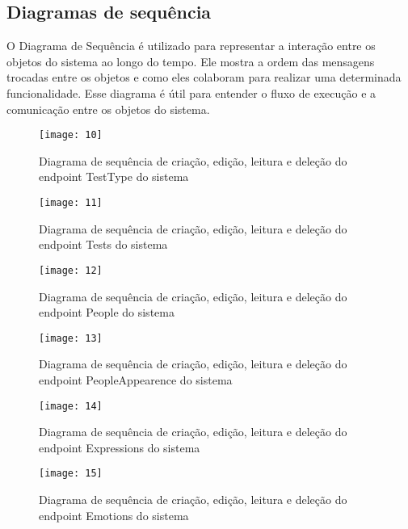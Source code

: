 \clearpage
\subsection{Diagramas de sequência \cite{28}}

O Diagrama de Sequência é utilizado para representar a interação entre os objetos do sistema ao longo do tempo. Ele mostra a ordem das mensagens trocadas entre os objetos e como eles colaboram para realizar uma determinada funcionalidade. Esse diagrama é útil para entender o fluxo de execução e a comunicação entre os objetos do sistema.

\begin{figure}[h]
  \caption{Diagrama de sequência de criação, edição, leitura e deleção do endpoint TestType do sistema}
  \centering
  \texttt{[image: 10]}
\end{figure}
\FloatBarrier

\begin{figure}[h]
  \caption{Diagrama de sequência de criação, edição, leitura e deleção do endpoint Tests do sistema}
  \centering
  \texttt{[image: 11]}
\end{figure}
\FloatBarrier

\begin{figure}[h]
  \caption{Diagrama de sequência de criação, edição, leitura e deleção do endpoint People do sistema}
  \centering
  \texttt{[image: 12]}
\end{figure}
\FloatBarrier

\begin{figure}[h]
  \caption{Diagrama de sequência de criação, edição, leitura e deleção do endpoint PeopleAppearence do sistema}
  \centering
  \texttt{[image: 13]}
\end{figure}
\FloatBarrier

\begin{figure}[h]
  \caption{Diagrama de sequência de criação, edição, leitura e deleção do endpoint Expressions do sistema}
  \centering
  \texttt{[image: 14]}
\end{figure}
\FloatBarrier

\begin{figure}[h]
  \caption{Diagrama de sequência de criação, edição, leitura e deleção do endpoint Emotions do sistema}
  \centering
  \texttt{[image: 15]}
\end{figure}
\FloatBarrier

